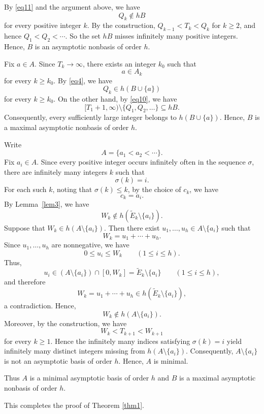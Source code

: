 \documentclass[reqno,12pt,twoside]{article}
\numberwithin{equation}{section}
\begin{document}
By \eqref{eq11} and the argument above, we have
\[
 Q_k\notin hB
\]
for every positive integer $k$. By the construction, $Q_{k-1}<T_k<Q_k$ for $k\ge2$, and hence $Q_1<Q_2<\cdots$. So the set $hB$ misses infinitely many positive integers. Hence, $B$ is an asymptotic nonbasis of order $h$.

Fix $a\in A$. Since $T_k\to\infty$, there exists an integer $k_0$ such that
\[
 a\in A_k
\]
for every $k\ge k_0$. By \eqref{eq4}, we have
\[
 Q_k\in h(B\cup\{a\})
\]
for every $k\ge k_0$. On the other hand, by \eqref{eq10}, we have
\[
 [T_1+1,\infty)\setminus\{Q_1,Q_2,\ldots\}\subseteq hB.
\]
Consequently, every sufficiently large integer belongs to $h(B\cup\{a\})$. Hence, $B$ is a maximal asymptotic nonbasis of order $h$.

Write
\[
 A=\{a_1<a_2<\cdots\}.
\]
Fix $a_i\in A$. Since every positive integer occurs infinitely often in the sequence $\sigma$, there are infinitely many integers $k$ such that
\[
 \sigma(k)=i.
\]
For each such $k$, noting that $\sigma(k)\le k$, by the choice of $c_k$, we have
\[
 c_k=a_i.
\]
By Lemma~\ref{lem3}, we have
\[
 W_k\notin h(\widetilde E_k\setminus\{a_i\}).
\]
Suppose that $W_k\in h(A\setminus\{a_i\})$. Then there exist $u_1,\ldots,u_h\in A\setminus\{a_i\}$ such that
\[
 W_k=u_1+\cdots+u_h.
\]
Since $u_1,\ldots,u_h$ are nonnegative, we have
\[
 0\le u_i\le W_k\qquad(1\le i\le h).
\]
Thus,
\[
 u_i\in (A\setminus\{a_i\})\cap[0,W_k]
 =\widetilde E_k\setminus\{a_i\}
 \qquad(1\le i\le h),
\]
and therefore
\[
 W_k=u_1+\cdots+u_h\in h(\widetilde E_k\setminus\{a_i\}),
\]
a contradiction. Hence,
\[
 W_k\notin h(A\setminus\{a_i\}).
\]
Moreover, by the construction, we have
\[
 W_k<T_{k+1}<W_{k+1}
\]
for every $k\ge1$. Hence the infinitely many indices satisfying $\sigma(k)=i$ yield infinitely many distinct integers missing from $h(A\setminus\{a_i\})$. Consequently, $A\setminus\{a_i\}$ is not an asymptotic basis of order $h$. Hence, $A$ is minimal.

Thus $A$ is a minimal asymptotic basis of order $h$ and $B$ is a maximal asymptotic nonbasis of order $h$. 

This completes the proof of Theorem \ref{thm1}.
\end{document}

